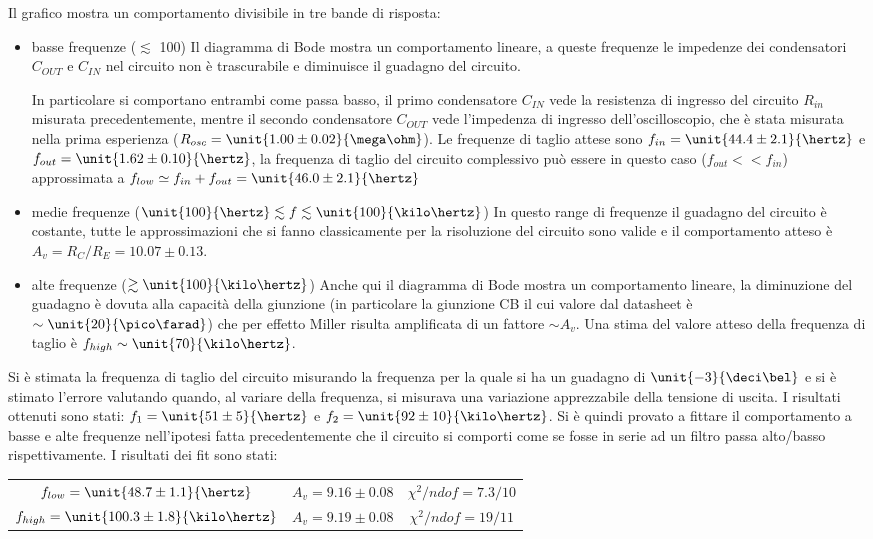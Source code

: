 \documentclass[10pt,a4paper]{article}
\begin{document}
Il grafico mostra un comportamento divisibile in tre bande di risposta:
\begin{itemize}
	\item {basse frequenze ($\lesssim$ \unit{100}{\hertz})} Il diagramma di Bode mostra un comportamento lineare, a queste frequenze le impedenze dei condensatori $C_{OUT}$ e $C_{IN}$ nel circuito non è trascurabile e diminuisce il guadagno del circuito. 
	
	In particolare si comportano entrambi come passa basso, il primo condensatore $C_{IN}$ vede la resistenza di ingresso del circuito $R_{in}$ misurata precedentemente, mentre il secondo condensatore $C_{OUT}$ vede l'impedenza di ingresso dell'oscilloscopio, che è stata misurata nella prima esperienza ($R_{osc} = \unit{1.00 \pm 0.02}{\mega\ohm}$). Le frequenze di taglio attese sono $f_{in}=\unit{44.4 \pm 2.1}{\hertz}$ e $f_{out}=\unit{1.62 \pm 0.10}{\hertz}$, la frequenza di taglio del circuito complessivo può essere in questo caso ($f_{out} << f_{in}$) approssimata a $f_{low} \simeq f_{in} + f_{out} = \unit{46.0 \pm 2.1}{\hertz}$
	
	
	\item {medie frequenze ($\unit{100}{\hertz} \lesssim f \lesssim \unit{100}{\kilo\hertz}$)} In questo range di frequenze il guadagno del circuito è costante, tutte le approssimazioni che si fanno classicamente per la risoluzione del circuito sono valide e il comportamento atteso è $A_v = R_C/R_E = 10.07\pm0.13$.
	
	\item {alte frequenze ($\gtrsim \unit{100}{\kilo\hertz}$)} Anche qui il diagramma di Bode mostra un comportamento lineare, la diminuzione del guadagno è dovuta alla capacità della giunzione (in particolare la giunzione CB il cui valore dal datasheet è $\sim \unit{20}{\pico\farad}$) che per effetto Miller risulta amplificata di un fattore $\sim A_v$. Una stima del valore atteso della frequenza di taglio è $f_{high} \sim \unit{70}{\kilo\hertz}$.
\end{itemize}

Si è stimata la frequenza di taglio del circuito misurando la frequenza per la quale si ha un guadagno di $\unit{-3}{\deci\bel}$ e si è stimato l'errore valutando quando, al variare della frequenza, si misurava una variazione apprezzabile della tensione di uscita.
I risultati ottenuti sono stati: $f_1 = \unit{51 \pm 5}{\hertz}$ e $f_2= \unit{92 \pm 10}{\kilo\hertz}$.
Si è quindi provato a fittare il comportamento a basse e alte frequenze nell'ipotesi fatta precedentemente che il circuito si comporti come se fosse in serie ad un filtro passa alto/basso rispettivamente.
I risultati dei fit sono stati:
\begin{table}[h!]
	\centering
\begin{tabular}{ccc}
$f_{low}=\unit{48.7 \pm 1.1}{\hertz}$ & $A_v = 9.16 \pm 0.08$ & $\chi^2/ndof = 7.3 / 10$ \\
$f_{high}=\unit{100.3 \pm 1.8}{\kilo\hertz}$ & $A_v = 9.19 \pm 0.08$ & $\chi^2/ndof = 19 / 11$
\end{tabular}
\end{table}
\end{document}
